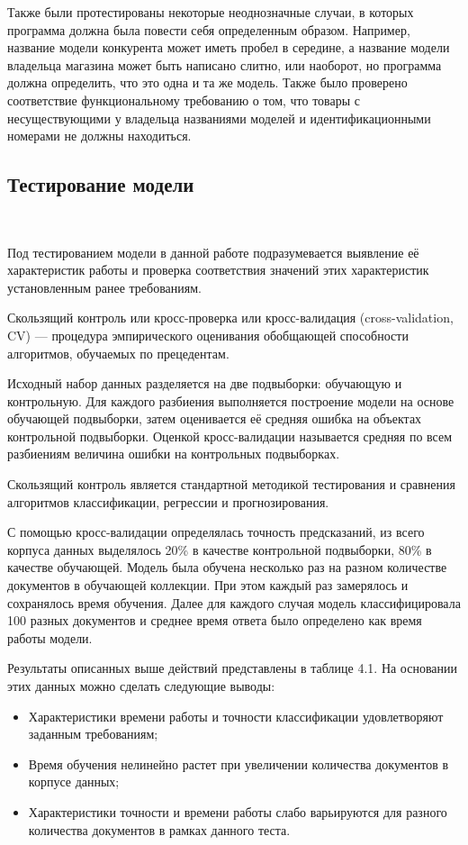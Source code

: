 Также были протестированы некоторые неоднозначные случаи, в которых программа должна была повести себя определенным образом. Например, название модели конкурента может иметь пробел в середине, а название модели владельца магазина может быть написано слитно, или наоборот, но программа должна определить, что это одна и та же модель. Также было проверено соответствие функциональному требованию о том, что товары с несуществующими у владельца названиями моделей и идентификационными номерами не должны находиться.

\newpage

\subsection{Тестирование модели}
\

Под тестированием модели в данной работе подразумевается выявление её характеристик работы и проверка соответствия значений этих характеристик установленным ранее требованиям.

Скользящий контроль или кросс-проверка или кросс-валидация (cross-validation, CV) — процедура эмпирического оценивания обобщающей способности алгоритмов, обучаемых по прецедентам. 

Исходный набор данных разделяется на две подвыборки: обучающую и контрольную. Для каждого разбиения выполняется построение модели на основе обучающей подвыборки, затем оценивается её средняя ошибка на объектах контрольной подвыборки. Оценкой кросс-валидации называется средняя по всем разбиениям величина ошибки на контрольных подвыборках.

Скользящий контроль является стандартной методикой тестирования и сравнения алгоритмов классификации, регрессии и прогнозирования. 

С помощью кросс-валидации определялась точность предсказаний, из всего корпуса данных выделялось 20\% в качестве контрольной подвыборки, 80\% в качестве обучающей. Модель была обучена несколько раз на разном количестве документов в обучающей коллекции. При этом каждый раз замерялось и сохранялось время обучения. Далее для каждого случая модель классифицировала 100 разных документов и среднее время ответа было определено как время работы модели.

Результаты описанных выше действий представлены в таблице 4.1. На основании этих данных можно сделать следующие выводы:

\begin{itemize}
	\item Характеристики времени работы и точности классификации удовлетворяют заданным требованиям;
	\item Время обучения нелинейно растет при увеличении количества документов в корпусе данных;
	\item Характеристики точности и времени работы слабо варьируются для разного количества документов в рамках данного теста.
\end{itemize}

